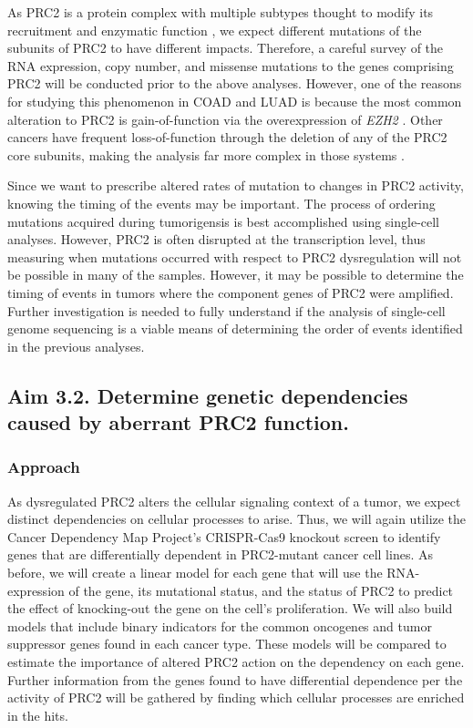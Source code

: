 As PRC2 is a protein complex with multiple subtypes thought to modify its recruitment and enzymatic function \cite{Wassef2017, Holoch2017, Kasinath2018, Laugesen2019a}, we expect different mutations of the subunits of PRC2 to have different impacts.
Therefore, a careful survey of the RNA expression, copy number, and missense mutations to the genes comprising PRC2 will be conducted prior to the above analyses.
However, one of the reasons for studying this phenomenon in COAD and LUAD is because the most common alteration to PRC2 is gain-of-function via the overexpression of \emph{EZH2} \cite{Comet2016MaintainingCancer.}.
Other cancers have frequent loss-of-function through the deletion of any of the PRC2 core subunits, making the analysis far more complex in those systems \cite{Comet2016MaintainingCancer.}.

Since we want to prescribe altered rates of mutation to changes in PRC2 activity, knowing the timing of the events may be important.
The process of ordering mutations acquired during tumorigensis is best accomplished using single-cell analyses.
However, PRC2 is often disrupted at the transcription level, thus measuring when mutations occurred with respect to PRC2 dysregulation will not be possible in many of the samples.
However, it may be possible to determine the timing of events in tumors where the component genes of PRC2 were amplified.
Further investigation is needed to fully understand if the analysis of single-cell genome sequencing is a viable means of determining the order of events identified in the previous analyses.




\subsection*{Aim 3.2. Determine genetic dependencies caused by aberrant PRC2 function.}


\subsubsection*{Approach}

As dysregulated PRC2 alters the cellular signaling context of a tumor, we expect distinct dependencies on cellular processes to arise.
Thus, we will again utilize the Cancer Dependency Map Project's CRISPR-Cas9 knockout screen to identify genes that are differentially dependent in PRC2-mutant cancer cell lines.
As before, we will create a linear model for each gene that will use the RNA-expression of the gene, its mutational status, and the status of PRC2 to predict the effect of knocking-out the gene on the cell's proliferation.
We will also build models that include binary indicators for the common oncogenes and tumor suppressor genes found in each cancer type.
These models will be compared to estimate the importance of altered PRC2 action on the dependency on each gene.
Further information from the genes found to have differential dependence per the activity of PRC2 will be gathered by finding which cellular processes are enriched in the hits.

